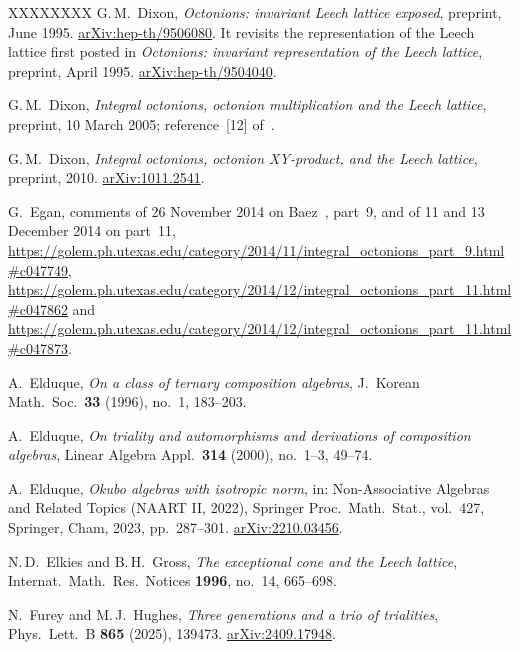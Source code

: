 \documentclass[twoside,english]{paper}
\numberwithin{equation}{section}
\numberwithin{figure}{section}
\theoremstyle{definition}
\theoremstyle{remark}
\begin{document}
\begin{thebibliography}{XXXXXXXX}
G.\,M.~Dixon,
\emph{Octonions: invariant Leech lattice exposed},
preprint, June 1995.
\href{https://arxiv.org/abs/hep-th/9506080}{arXiv:hep-th/9506080}.
It revisits the representation of the Leech lattice first posted in
\emph{Octonions: invariant representation of the Leech lattice},
preprint, April 1995.
\href{https://arxiv.org/abs/hep-th/9504040}{arXiv:hep-th/9504040}.

G.\,M.~Dixon,
\emph{Integral octonions, octonion multiplication and the Leech
lattice}, preprint, 10 March 2005; reference~[12]
of~\cite{Wilson2009}.

G.\,M.~Dixon,
\emph{Integral octonions, octonion XY-product, and the Leech lattice},
preprint, 2010.
\href{https://arxiv.org/abs/1011.2541}{arXiv:1011.2541}.

G.~Egan,
comments of 26 November 2014 on Baez~\cite{Baez2014}, part~9, and of
11 and 13 December 2014 on part~11,
\url{https://golem.ph.utexas.edu/category/2014/11/integral_octonions_part_9.html#c047749},
\url{https://golem.ph.utexas.edu/category/2014/12/integral_octonions_part_11.html#c047862}
and
\url{https://golem.ph.utexas.edu/category/2014/12/integral_octonions_part_11.html#c047873}.

A.~Elduque,
\emph{On a class of ternary composition algebras},
J.~Korean Math.\ Soc.\ \textbf{33} (1996), no.~1, 183--203.

A.~Elduque,
\emph{On triality and automorphisms and derivations of composition
algebras},
Linear Algebra Appl.\ \textbf{314} (2000), no.~1--3, 49--74.

A.~Elduque,
\emph{Okubo algebras with isotropic norm},
in: Non-Associative Algebras and Related Topics (NAART II, 2022),
Springer Proc.\ Math.\ Stat., vol.~427, Springer, Cham, 2023,
pp.~287--301.
\href{https://arxiv.org/abs/2210.03456}{arXiv:2210.03456}.

N.\,D.~Elkies and B.\,H.~Gross,
\emph{The exceptional cone and the Leech lattice},
Internat.\ Math.\ Res.\ Notices \textbf{1996}, no.~14, 665--698.

N.~Furey and M.\,J.~Hughes,
\emph{Three generations and a trio of trialities},
Phys.\ Lett.\ B \textbf{865} (2025), 139473.
\href{https://arxiv.org/abs/2409.17948}{arXiv:2409.17948}.


\end{thebibliography}
\end{document}
